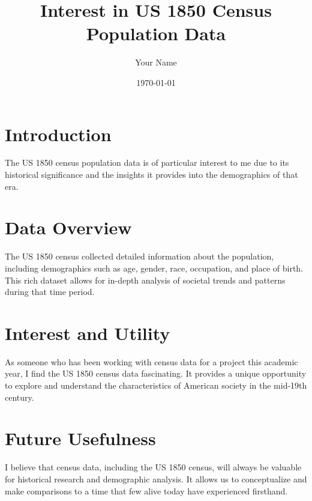 \documentclass{article}
\title{Interest in US 1850 Census Population Data}
\author{Your Name}
\date{\today}
\begin{document}
\maketitle

\section{Introduction}
The US 1850 census population data is of particular interest to me due to its historical significance and the insights it provides into the demographics of that era.

\section{Data Overview}
The US 1850 census collected detailed information about the population, including demographics such as age, gender, race, occupation, and place of birth. This rich dataset allows for in-depth analysis of societal trends and patterns during that time period.

\section{Interest and Utility}
As someone who has been working with census data for a project this academic year, I find the US 1850 census data fascinating. It provides a unique opportunity to explore and understand the characteristics of American society in the mid-19th century.

\section{Future Usefulness}
I believe that census data, including the US 1850 census, will always be valuable for historical research and demographic analysis. It allows us to conceptualize and make comparisons to a time that few alive today have experienced firsthand.
\end{document}
